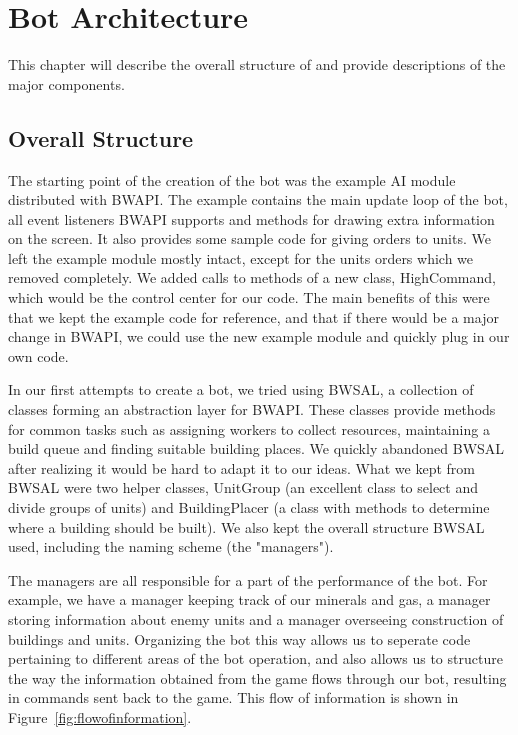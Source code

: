 
\chapter{Bot Architecture}
\label{chap:implementation}

This chapter will describe the overall structure of \massexpand and provide descriptions of the major components.

\section{Overall Structure}

The starting point of the creation of the bot was the example AI module distributed with BWAPI. The example contains the main update loop of the bot, all event listeners BWAPI supports and methods for drawing extra information on the screen. It also provides some sample code for giving orders to units. We left the example module mostly intact, except for the units orders which we removed completely. We added calls to methods of a new class, HighCommand, which would be the control center for our code. The main benefits of this were that we kept the example code for reference, and that if there would be a major change in BWAPI, we could use the new example module and quickly plug in our own code.

In our first attempts to create a bot, we tried using BWSAL, a collection of classes forming an abstraction layer for BWAPI. These classes provide methods for common tasks such as assigning workers to collect resources, maintaining a build queue and finding suitable building places. We quickly abandoned BWSAL after realizing it would be hard to adapt it to our ideas. What we kept from BWSAL were two helper classes, UnitGroup (an excellent class to select and divide groups of units) and BuildingPlacer (a class with methods to determine where a building should be built). We also kept the overall structure BWSAL used, including the naming scheme (the "managers").

The managers are all responsible for a part of the performance of the bot. For example, we have a manager keeping track of our minerals and gas, a manager storing information about enemy units and a manager overseeing construction of buildings and units. Organizing the bot this way allows us to seperate code pertaining to different areas of the bot operation, and also allows us to structure the way the information obtained from the game flows through our bot, resulting in commands sent back to the game. This flow of information is shown in Figure~\ref{fig:flowofinformation}.

